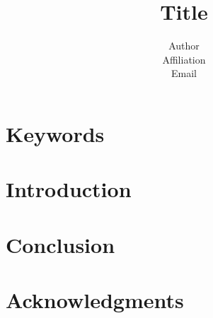 \documentclass[10pt,sigconf,authorversion]{lpc}
\title{Title}
\author{Author\\
Affiliation\\
Email\\
}
\begin{document}
\maketitle

\begin{abstract}

\end{abstract}

\section{Keywords}

\section{Introduction}

\section{Conclusion}

\section{Acknowledgments}


%
\end{document}
